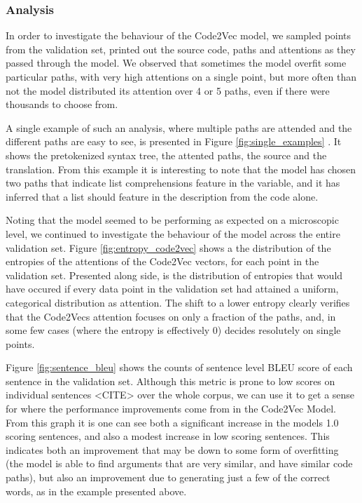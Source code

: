 \subsubsection{Analysis} %
\label{ssub:analysis}

In order to investigate the behaviour of the Code2Vec model, we sampled points from the validation set, printed out the source code, paths and attentions as they passed through the model.
We observed that sometimes the model overfit some particular paths, with very high attentions on a single point, but more often than not the model distributed its attention over 4 or 5 paths, even if there were thousands to choose from.

A single example of such an analysis, where multiple paths are attended and the different paths are easy to see, is presented in Figure  \ref{fig:single_examples} .
It shows the pretokenized syntax tree, the attented paths, the source and the translation.
From this example it is interesting to note that the model has chosen two paths that indicate list comprehensions feature in the variable, and it has inferred that a list should feature in the description from the code alone.

Noting that the model seemed to be performing as expected on a microscopic level, we continued to investigate the behaviour of the model across the entire validation set. 
Figure \ref{fig:entropy_code2vec} shows a the distribution of the entropies of the attentions of the Code2Vec vectors, for each point in the validation set. 
Presented along side, is the distribution of entropies that would have occured if every data point in the validation set had attained a uniform, categorical distribution as attention.
The shift to a lower entropy clearly verifies that the Code2Vecs attention focuses on only a fraction of the paths, and, in some few cases (where the entropy is effectively 0) decides resolutely on single points.

Figure \ref{fig:sentence_bleu} shows the counts of sentence level BLEU score of each sentence in the validation set.
Although this metric is prone to low scores on individual sentences <CITE> over the whole corpus, we can use it to get a sense for where the performance improvements come from in the Code2Vec Model.
From this graph it is one can see both a significant increase in the models 1.0 scoring sentences, and also a modest increase in low scoring sentences. 
This indicates both an improvement that may be down to some form of overfitting (the model is able to find arguments that are very similar, and have similar code paths), but also an improvement due to generating just a few of the correct words, as in the example presented above. 



